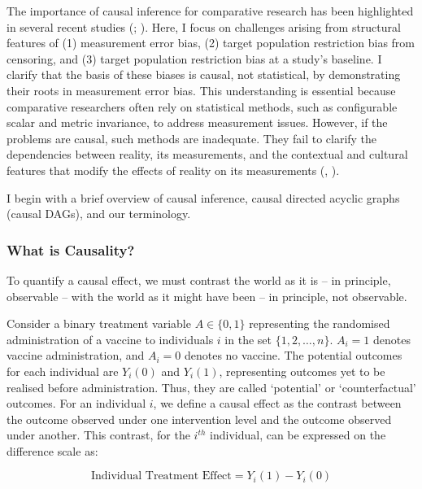 \documentclass[
  single column]{article}
\begin{document}
The importance of causal inference for comparative research has been
highlighted in several recent studies
(;
). Here, I focus
on challenges arising from structural features of (1) measurement error
bias, (2) target population restriction bias from censoring, and (3)
target population restriction bias at a study's baseline. I clarify that
the basis of these biases is causal, not statistical, by demonstrating
their roots in measurement error bias. This understanding is essential
because comparative researchers often rely on statistical methods, such
as configurable scalar and metric invariance, to address measurement
issues. However, if the problems are causal, such methods are
inadequate. They fail to clarify the dependencies between reality, its
measurements, and the contextual and cultural features that modify the
effects of reality on its measurements
(,
).

I begin with a brief overview of causal inference, causal directed
acyclic graphs (causal DAGs), and our terminology.

\subsubsection{What is Causality?}\label{what-is-causality}

To quantify a causal effect, we must contrast the world as it is -- in
principle, observable -- with the world as it might have been -- in
principle, not observable.

Consider a binary treatment variable \(A \in \{0,1\}\) representing the
randomised administration of a vaccine to individuals \(i\) in the set
\(\{1, 2, \ldots, n\}\). \(A_i = 1\) denotes vaccine administration, and
\(A_i = 0\) denotes no vaccine. The potential outcomes for each
individual are \(Y_i(0)\) and \(Y_i(1)\), representing outcomes yet to
be realised before administration. Thus, they are called `potential' or
`counterfactual' outcomes. For an individual \(i\), we define a causal
effect as the contrast between the outcome observed under one
intervention level and the outcome observed under another. This
contrast, for the \(i^{th}\) individual, can be expressed on the
difference scale as:

\[
\text{Individual Treatment Effect} = Y_i(1) - Y_i(0)
\]
\end{document}
